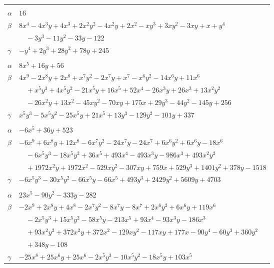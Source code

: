 \documentclass[11pt]{article}
\begin{document}
\begin{longtable}{@{}ll@{}}
\addlinespace[3pt]
\multicolumn{2}{@{}l}{$\{i,j\}=\{13,15\}$, $k_{ij}=2^{4}\cdot 3^{3}$}\\
$\alpha$ & $16$\\
$\beta$ & $8x^{4}-4x^{3}y+4x^{3}+2x^{2}y^{2}-4x^{2}y+2x^{2}-xy^{3}+3xy^{2}-3xy+x+y^{4}$\\
 & $\quad -3y^{3}-11y^{2}-33y-122$\\
$\gamma$ & $-y^{4}+2y^{3}+28y^{2}+78y+245$\\
\addlinespace[3pt]
\multicolumn{2}{@{}l}{$\{i,j\}=\{13,21\}$, $k_{ij}=2^{5}\cdot 3\cdot 5$}\\
$\alpha$ & $8x^{5}+16y+56$\\
$\beta$ & $4x^{9}-2x^{8}y+2x^{8}+x^{7}y^{2}-2x^{7}y+x^{7}-x^{6}y^{2}-14x^{6}y+11x^{6}$\\
 & $\quad +x^{5}y^{3}+4x^{5}y^{2}-21x^{5}y+16x^{5}+52x^{4}-26x^{3}y+26x^{3}+13x^{2}y^{2}$\\
 & $\quad -26x^{2}y+13x^{2}-45xy^{2}-70xy+175x+29y^{3}-44y^{2}-145y+256$\\
$\gamma$ & $x^{5}y^{3}-5x^{5}y^{2}-25x^{5}y+21x^{5}+13y^{3}-129y^{2}-101y+337$\\
\addlinespace[3pt]
\multicolumn{2}{@{}l}{$\{i,j\}=\{14,19\}$, $k_{ij}=5^{2}\cdot 17$}\\
$\alpha$ & $-6x^{5}+36y+523$\\
$\beta$ & $-6x^{9}+6x^{8}y+12x^{8}-6x^{7}y^{2}-24x^{7}y-24x^{7}+6x^{6}y^{2}+6x^{6}y-18x^{6}$\\
 & $\quad -6x^{5}y^{3}-18x^{5}y^{2}+36x^{5}+493x^{4}-493x^{3}y-986x^{3}+493x^{2}y^{2}$\\
 & $\quad +1972x^{2}y+1972x^{2}-529xy^{2}-307xy+759x+529y^{3}+1401y^{2}+378y-1518$\\
$\gamma$ & $-6x^{5}y^{3}-30x^{5}y^{2}-66x^{5}y-66x^{5}+493y^{3}+2429y^{2}+5609y+4703$\\
\addlinespace[3pt]
\multicolumn{2}{@{}l}{$\{i,j\}=\{14,20\}$, $k_{ij}=3^{2}$}\\
$\alpha$ & $23x^{5}-90y^{2}-333y-282$\\
$\beta$ & $-2x^{9}+2x^{8}y+4x^{8}-2x^{7}y^{2}-8x^{7}y-8x^{7}+2x^{6}y^{2}+6x^{6}y+119x^{6}$\\
 & $\quad -2x^{5}y^{3}+15x^{5}y^{2}-58x^{5}y-213x^{5}+93x^{4}-93x^{3}y-186x^{3}$\\
 & $\quad +93x^{2}y^{2}+372x^{2}y+372x^{2}-129xy^{2}-117xy+177x-90y^{4}-60y^{3}+360y^{2}$\\
 & $\quad +348y-108$\\
$\gamma$ & $-25x^{8}+25x^{6}y+25x^{6}-2x^{5}y^{3}-10x^{5}y^{2}-18x^{5}y+103x^{5}$\\

\end{longtable}
\end{document}
